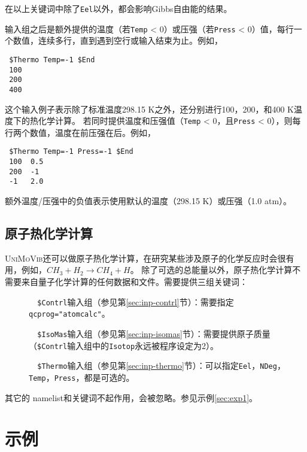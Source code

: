 \documentclass[12pt,a4paper,openany,twoside,cap,UTF8]{ctexbook}
\begin{document}
在以上关键词中除了\verb|Eel|以外，都会影响Gibbs自由能的结果。

输入组之后是额外提供的温度（若\verb|Temp| < 0）或压强（若\verb|Press| < 0）值，每行一个数值，连续多行，直到遇到空行或输入结束为止。例如，
\begin{colorboxed}[oval=false,boxcolor=blue!75!black,bgcolor=blue!5!white]
\ttfamily
\begin{lstlisting}
 $Thermo Temp=-1 $End
 100
 200
 400
\end{lstlisting}\end{colorboxed}
这个输入例子表示除了标准温度298.15 K之外，还分别进行100，200，和400 K温度下的热化学计算。
若同时提供温度和压强值（\verb|Temp| < 0，且\verb|Press| < 0），则每行两个数值，温度在前压强在后。例如，
\begin{colorboxed}[oval=false,boxcolor=blue!75!black,bgcolor=blue!5!white]
\ttfamily
\begin{lstlisting}
 $Thermo Temp=-1 Press=-1 $End
 100  0.5
 200  -1
 -1   2.0
\end{lstlisting}\end{colorboxed}
额外温度/压强中的负值表示使用默认的温度（298.15 K）或压强（1.0 atm）。

\section{原子热化学计算} \label{sec:inp-atom}

\textsc{UniMoVib}还可以做原子热化学计算，在研究某些涉及原子的化学反应时会很有用，例如，$CH_3 + H_2 \rightarrow CH_4 + H$。
除了可选的总能量以外，原子热化学计算不需要来自量子化学计算的任何数据和文件。需要提供三组关键词：

\begin{description}
\item[ ]\verb|  $Contrl|输入组（参见第\ref{sec:inp-contrl}节）：需要指定\verb|qcprog="atomcalc"|。
\item[ ]\verb|  $IsoMas|输入组（参见第\ref{sec:inp-isomas}节）：需要提供原子质量（\verb|$Contrl|输入组中的\verb|Isotop|永远被程序设定为2）。
\item[ ]\verb|  $Thermo|输入组（参见第\ref{sec:inp-thermo}节）：可以指定\verb|Eel|，\verb|NDeg|，\verb|Temp|，\verb|Press|，都是可选的。
\end{description}
其它的 namelist和关键词不起作用，会被忽略。参见示例\ref{sec:exp1}。

\chapter{示例} \label{part:examp}
\end{document}
